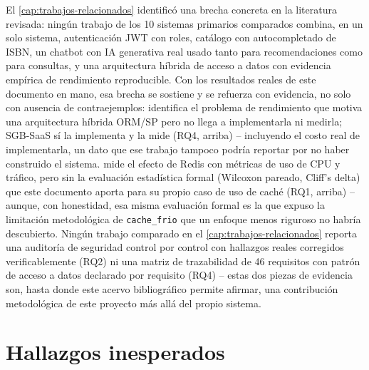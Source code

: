 El \autoref{cap:trabajos-relacionados} identificó una brecha concreta en
la literatura revisada: ningún trabajo de los 10 sistemas primarios
comparados combina, en un solo sistema, autenticación JWT con roles,
catálogo con autocompletado de ISBN, un chatbot con IA generativa real
usado tanto para recomendaciones como para consultas, y una arquitectura
híbrida de acceso a datos con evidencia empírica de rendimiento
reproducible. Con los resultados reales de este documento en mano, esa
brecha se sostiene y se refuerza con evidencia, no solo con ausencia de
contraejemplos: \citet{colley2018ormperformance} identifica el problema
de rendimiento que motiva una arquitectura híbrida ORM/SP pero no llega a
implementarla ni medirla; SGB-SaaS sí la implementa y la mide (RQ4,
arriba) -- incluyendo el costo real de implementarla, un dato que ese
trabajo tampoco podría reportar por no haber construido el sistema.
\citet{kusuma2017rediscaching} mide el efecto de Redis con métricas de
uso de CPU y tráfico, pero sin la evaluación estadística formal (Wilcoxon
pareado, Cliff's delta) que este documento aporta para su propio caso de
uso de caché (RQ1, arriba) -- aunque, con honestidad, esa misma
evaluación formal es la que expuso la limitación metodológica de
\texttt{cache\_frio} que un enfoque menos riguroso no habría descubierto.
Ningún trabajo comparado en el \autoref{cap:trabajos-relacionados} reporta una auditoría de
seguridad control por control con hallazgos reales corregidos
verificablemente (RQ2) ni una matriz de trazabilidad de 46 requisitos con
patrón de acceso a datos declarado por requisito (RQ4) -- estas dos
piezas de evidencia son, hasta donde este acervo bibliográfico permite
afirmar, una contribución metodológica de este proyecto más allá del
propio sistema.

\section{Hallazgos inesperados}

